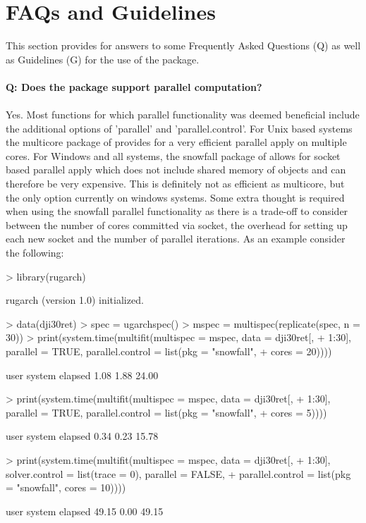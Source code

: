 \section{FAQs and Guidelines}\label{section:faqs}
This section provides for answers to some Frequently Asked Questions (Q) as well
as Guidelines (G) for the use of the \verb@rugarch@ package.\\
\\
\textbf{Q: Does the package support parallel computation?}\\
\\
Yes. Most functions for which parallel functionality was deemed beneficial
include the additional options of 'parallel' and 'parallel.control'. For Unix
based systems the multicore package of \citet{Urbanek} provides
for a very efficient parallel apply on multiple cores. For Windows and all
systems, the snowfall package of \citet{Knaus} allows for socket based parallel
apply which does not include shared memory of objects and can therefore be very
expensive. This is definitely not as efficient as multicore, but the only option
currently on windows systems. Some extra thought is required when using the
snowfall parallel functionality as there is a trade-off to consider between the
number of cores committed via socket, the overhead for setting up each new
socket and the number of parallel iterations. As an example consider the
following:
\begin{Schunk}
\begin{Sinput}
> library(rugarch)
\end{Sinput}
\begin{Soutput}
rugarch (version 1.0) initialized.
\end{Soutput}
\begin{Sinput}
> data(dji30ret)
> spec = ugarchspec()
> mspec = multispec(replicate(spec, n = 30))
> print(system.time(multifit(multispec = mspec, data = dji30ret[,
+     1:30], parallel = TRUE, parallel.control = list(pkg = "snowfall",
+     cores = 20))))
\end{Sinput}
\begin{Soutput}
   user  system elapsed
   1.08    1.88   24.00
\end{Soutput}
\begin{Sinput}
> print(system.time(multifit(multispec = mspec, data = dji30ret[,
+     1:30], parallel = TRUE, parallel.control = list(pkg = "snowfall",
+     cores = 5))))
\end{Sinput}
\begin{Soutput}
   user  system elapsed
   0.34    0.23   15.78
\end{Soutput}
\begin{Sinput}
> print(system.time(multifit(multispec = mspec, data = dji30ret[,
+     1:30], solver.control = list(trace = 0), parallel = FALSE,
+     parallel.control = list(pkg = "snowfall", cores = 10))))
\end{Sinput}
\begin{Soutput}
   user  system elapsed
  49.15    0.00   49.15
\end{Soutput}
\end{Schunk}
